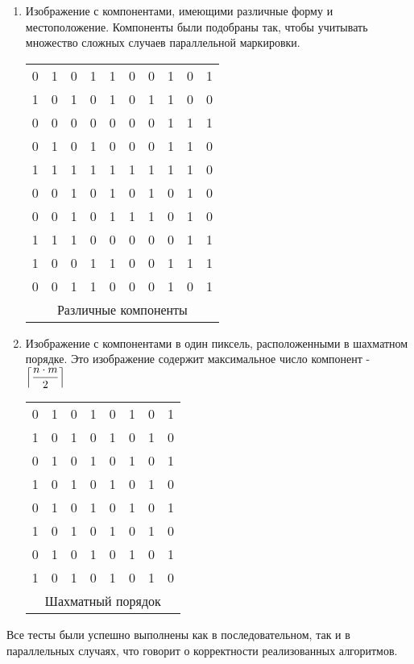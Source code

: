 \documentclass[14pt]{extarticle}
\begin{document}
\begin{enumerate}
\begin{center}
    \end{center}
    \item Изображение с компонентами, имеющими различные форму и местоположение. Компоненты были подобраны так, чтобы учитывать множество сложных случаев параллельной маркировки.
    \\\begin{center}\begin{tabular}{ |cccccccccc | }
    \hline
     0 & 1 & 0 & 1 & 1 & 0&0&1&0&1\\
     1 & 0 & 1 & 0 & 1&0&1&1&0&0\\
     0&0&0&0&0&0&0&1&1&1\\
     0&1&0&1&0&0&0&1&1&0\\
     1&1&1&1&1&1&1&1&1&0\\
     0&0&1&0&1&0&1&0&1&0\\
     0&0&1&0&1&1&1&0&1&0\\
     1&1&1&0&0&0&0&0&1&1\\
     1&0&0&1&1&0&0&1&1&1\\
     0&0&1&1&0&0&0&1&0&1\\
     \hline
     \multicolumn{10}{c}{Различные компоненты}
    \end{tabular}
    \end{center}
    \item Изображение с компонентами в один пиксель, расположенными в шахматном порядке. Это изображение содержит максимальное число компонент - \(\Bigl \lceil \displaystyle\frac{n\cdot m}{2}\Bigr \rceil\)
    \\\begin{center}\begin{tabular}{ |cccccccc| }
    \hline
     0&1&0&1&0&1&0&1\\
     1&0&1&0&1&0&1&0\\
     0&1&0&1&0&1&0&1\\
     1&0&1&0&1&0&1&0\\
     0&1&0&1&0&1&0&1\\
     1&0&1&0&1&0&1&0\\
     0&1&0&1&0&1&0&1\\
     1&0&1&0&1&0&1&0\\
     \hline
     \multicolumn{8}{c}{Шахматный порядок}
    \end{tabular}
    \end{center}
\end{enumerate}
\par Все тесты были успешно выполнены как в последовательном, так и в параллельных случаях, что говорит о корректности реализованных алгоритмов.
\newpage
\end{document}
